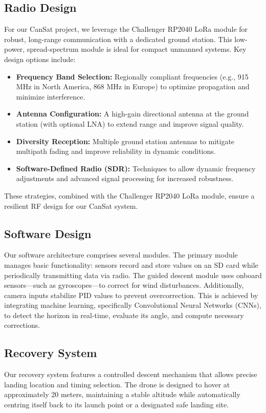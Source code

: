 \documentclass{article}
\begin{document}
\subsection{Radio Design}
For our CanSat project, we leverage the Challenger RP2040 LoRa module for robust, long-range communication with a dedicated ground station. This low-power, spread-spectrum module is ideal for compact unmanned systems. Key design options include:
\begin{itemize}
    \item \textbf{Frequency Band Selection:} Regionally compliant frequencies (e.g., 915 MHz in North America, 868 MHz in Europe) to optimize propagation and minimize interference.
    \item \textbf{Antenna Configuration:} A high-gain directional antenna at the ground station (with optional LNA) to extend range and improve signal quality.
    \item \textbf{Diversity Reception:} Multiple ground station antennas to mitigate multipath fading and improve reliability in dynamic conditions.
    \item \textbf{Software-Defined Radio (SDR):} Techniques to allow dynamic frequency adjustments and advanced signal processing for increased robustness.
\end{itemize}
These strategies, combined with the Challenger RP2040 LoRa module, ensure a resilient RF design for our CanSat system.

\subsection{Software Design}
Our software architecture comprises several modules. The primary module manages basic functionality: sensors record and store values on an SD card while periodically transmitting data via radio. The guided descent module uses onboard sensors—such as gyroscopes—to correct for wind disturbances. Additionally, camera inputs stabilize PID values to prevent overcorrection. This is achieved by integrating machine learning, specifically Convolutional Neural Networks (CNNs), to detect the horizon in real-time, evaluate its angle, and compute necessary corrections.

\subsection{Recovery System}
Our recovery system features a controlled descent mechanism that allows precise landing location and timing selection. The drone is designed to hover at approximately 20 meters, maintaining a stable altitude while automatically centring itself back to its launch point or a designated safe landing site.
\end{document}
